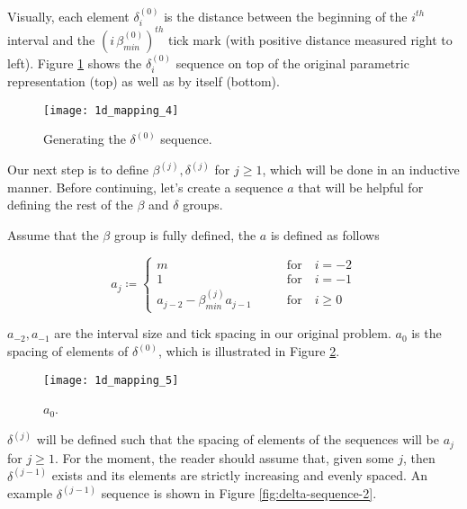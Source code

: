 Visually, each element $\delta^{(0)}_i$ is the distance between the beginning of the $i^{th}$ interval and the $(i \, \beta^{(0)}_{min})^{th}$ tick mark (with positive distance measured right to left). Figure \ref{fig:delta-sequence} shows the $\delta^{(0)}_i$ sequence on top of the original parametric representation (top) as well as by itself (bottom).

\begin{figure}[H]
  \begin{center}
    \texttt{[image: 1d\_mapping\_4]}
  \end{center}
  \vspace{-.2in} %
  \caption{\label{fig:delta-sequence} Generating the $\delta^{(0)}$ sequence.}
\end{figure}

Our next step is to define $\beta^{(j)}, \delta^{(j)}$ for $j \ge 1$, which will be done in an inductive manner. Before continuing, let's create a sequence $a$ that will be helpful for defining the rest of the $\beta$ and $\delta$ groups.

\begin{definition}
  Assume that the $\beta$ group is fully defined, the $a$ is defined as follows

  \begin{equation}
    a_j \coloneqq \begin{cases}
      m \qquad &\text{for} \quad i = -2\\
      1 \qquad &\text{for} \quad i = -1\\
      a_{j-2} - \beta^{(j)}_{min} a_{j-1} \qquad &\text{for} \quad i \ge 0
    \end{cases}
  \end{equation}
\end{definition}

$a_{-2}, a_{-1}$ are the interval size and tick spacing in our original problem. $a_0$ is the spacing of elements of $\delta^{(0)}$, which is illustrated in Figure \ref{fig:a-0}.

\begin{figure}[H]
  \begin{center}
    \texttt{[image: 1d\_mapping\_5]}
  \end{center}
  \vspace{-.2in} %
  \caption{\label{fig:a-0} $a_0$.}
\end{figure}

$\delta^{(j)}$ will be defined such that the spacing of elements of the sequences will be $a_j$ for $j \ge 1$. For the moment, the reader should assume that, given some $j$, then $\delta^{(j-1)}$ exists and its elements are strictly increasing and evenly spaced. An example $\delta^{(j-1)}$ sequence is shown in Figure \ref{fig:delta-sequence-2}.

